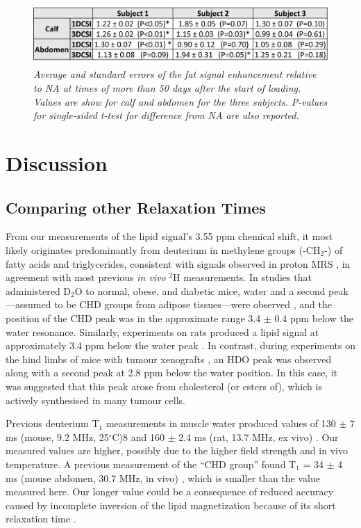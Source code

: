 \documentclass[class=article, crop=false]{standalone}
\begin{document}
\begin{figure}
    \centering
    \includegraphics[width=1\textwidth]{Figures/Lipid/Lipid_Table.png}
    \caption{\textit{Average and standard errors of the fat signal enhancement relative to NA at times of more than 50 days after the start of loading. Values are show for calf and abdomen for the three subjects. P-values for single-sided t-test for difference from NA are also reported.}}
    \label{fig:Lip:Amp_Table}
\end{figure}

\section{Discussion}

\subsection{Comparing other Relaxation Times}

From our measurements of the lipid signal’s 3.55 ppm chemical shift, it most likely originates predominantly from deuterium in methylene groups (-CH$_2$-) of fatty acids and triglycerides, consistent with signals observed in proton MRS \cite{Ren2008CompositionTesla}, in agreement with most previous \textit{in vivo} $^2$H measurements. In studies that administered D$_2$O to normal, obese, and diabetic mice, water and a second peak—assumed to be CHD groups from adipose tissues—were observed \cite{Brereton1986PreliminarySpectroscopy, Brereton1989TheMice}, and the position of the CHD peak was in the approximate range 3.4 $\pm$ 0.4 ppm below the water resonance. Similarly, experiments on rats produced a lipid signal at approximately 3.4 ppm below the water peak \cite{Kosenkov2018TheMice}. In contrast, during experiments on the hind limbs of mice with tumour xenografts \cite{Assmann2020InCholesterol}, an HDO peak was observed along with a second peak at 2.8 ppm below the water position. In this case, it was suggested \cite{Assmann2020InCholesterol} that this peak arose from cholesterol (or esters of), which is actively synthesised in many tumour cells.

Previous deuterium T$_1$ measurements in muscle water produced values of 130 $\pm$ 7 ms (mouse, 9.2 MHz, 25$^\circ$C)8 and 160 $\pm$ 2.4 ms (rat, 13.7 MHz, ex vivo) \cite{Block1987COMMUNICATIONSTissues}. Our measured values are higher, possibly due to the higher field strength and in vivo temperature. A previous measurement of the “CHD group” found T$_1$ = 34 $\pm$ 4 ms (mouse abdomen, 30.7 MHz, in vivo) \cite{Brereton1986PreliminarySpectroscopy}, which is smaller than the value measured here. Our longer value could be a consequence of reduced accuracy caused by incomplete inversion of the lipid magnetization because of its short relaxation time \cite{Pfaff2017PredictingPulses}.
\end{document}
